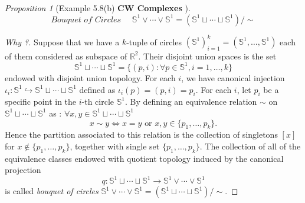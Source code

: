 \documentclass[a4paper]{article}
\theoremstyle{remark}
\newtheorem{prop}{Proposition}
\newcommand{\er}{\mathbb{R}} %
\newcommand{\s}{\mathbb{S}} %
\begin{document}
\begin{prop}[Example 5.8(b) \textbf{CW Complexes} \cite{LeeTM}]
	$$\textit{Bouquet of Circles }\quad  \s^1 \vee \cdots \vee \s^1 = (\s^1 \sqcup \cdots \sqcup \s^1)/{\sim}$$
\end{prop}
\begin{proof}[Why ?]
	Suppose that we have a $k$-tuple of circles $(\s^1)_{i=1}^k =( \s^1, \dots, \s^1)$ each of them considered as subspace of $\er^2$. Their disjoint union spaces is the set
	$$
	\s^1 \sqcup \cdots \sqcup \s^1  = \{ (p,i) : \forall p \in \s^1, i = 1,\dots,k \}    
	$$
	endowed with disjoint union topology. For each $i$, we have canonical injection $\iota_i : \s^1 \hookrightarrow \s^1 \sqcup \cdots \sqcup \s^1 $ defined as $\iota_i(p) = (p,i)=p_i$. For each $i$, let $p_i$ be a specific point in the $i$-th circle $\s^1$.  By defining an equivalence relation $\sim$ on $\s^1 \sqcup \cdots \sqcup \s^1$ as : $\forall x,y \in \s^1 \sqcup \cdots \sqcup \s^1$
	$$
	 x \sim y \Leftrightarrow x=y \text{ or } x,y \in \{p_1,\dots,p_k\}.
	$$
	Hence the partition associated to this relation is the collection of singletons $[x]$ for $x \notin \{p_1,\dots,p_k\}$, together with single set $\{p_1,\dots,p_k\}$. The collection of all of the equivalence classes endowed with quotient topology induced by the canonical projection
	$$
	q :  \s^1 \sqcup \cdots \sqcup \s^1 \to \s^1 \vee \cdots \vee \s^1
	$$ 
	is called \textit{bouquet of circles} $\s^1 \vee \cdots \vee \s^1=(\s^1 \sqcup \cdots \sqcup \s^1)/{\sim}$.
	

\end{proof}
\end{document}
